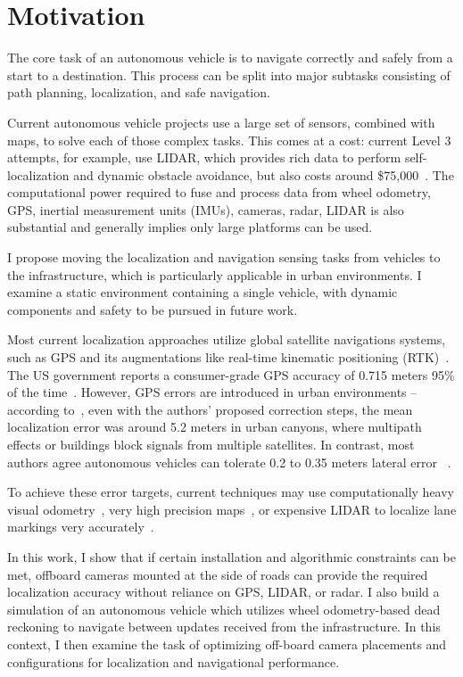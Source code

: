 \documentclass[a4paper,12pt,twoside,openright]{report}
\begin{document}
\section{Motivation}
\label{sec:intro:motivation}

The core task of an autonomous vehicle is to navigate correctly and safely from a start
to a destination. This process can be split into major subtasks consisting
of path planning, localization, and safe navigation.

Current autonomous vehicle projects use a large set of sensors, combined with
maps, to solve each of those complex tasks. This comes at a cost: current
Level 3 attempts, for example, use LIDAR, which 
provides rich data to perform self-localization and dynamic obstacle avoidance,
but also costs around \$75,000~\cite{lin2018architectural}. The computational
power required to fuse and process data from wheel odometry,
GPS, inertial measurement units (IMUs), cameras, radar, LIDAR is also substantial
and generally implies only large platforms can be used.

I propose moving the localization and navigation sensing tasks
from vehicles to the infrastructure, which is particularly applicable in urban environments.
I examine a static environment containing a single vehicle, with dynamic components and safety
to be pursued in future work. 

Most current localization approaches utilize global satellite navigations systems,
such as GPS and its augmentations like real-time kinematic positioning (RTK)~\cite{scherzinger2000precise}.
The US government reports a consumer-grade GPS accuracy of 0.715 meters 95\% of the time~\cite{USGPSPerformance}. 
However, GPS errors are introduced in urban environments -- according to~\citeauthor{miura2015gps}, even with the
authors' proposed correction steps, the mean localization error was around 5.2 meters in urban canyons, where
multipath effects or buildings block signals from multiple satellites. 
In contrast, most authors agree autonomous vehicles can tolerate 0.2 to 0.35 meters lateral error
~\cite{vivacqua2017low}\cite{ziegler2014video}\cite{mattern2010high}.

To achieve these error targets, current techniques may use computationally heavy visual odometry~\cite{ziegler2014video},
very high precision maps~\cite{mattern2010high}, or expensive LIDAR to localize
lane markings very accurately~\cite{hata2014road}.  

In this work, I show that if certain installation and algorithmic constraints
can be met, offboard cameras mounted at the side of roads can provide the required localization
accuracy without reliance on GPS, LIDAR, or radar. I also build a simulation
of an autonomous vehicle which utilizes wheel odometry-based dead reckoning 
to navigate between updates received from the infrastructure. In this context,
I then examine the task of optimizing off-board camera placements and configurations for localization and navigational performance.
\end{document}
